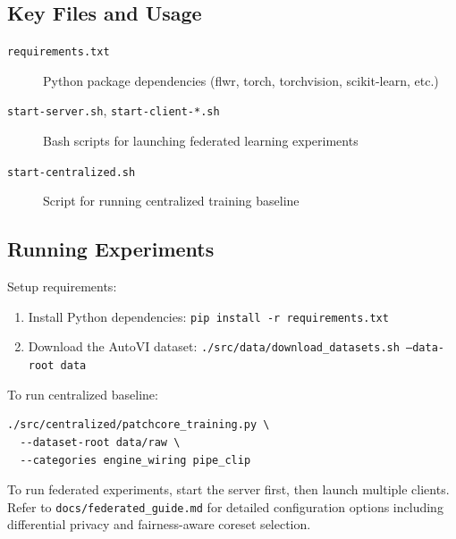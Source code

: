 \documentclass{article}
\begin{document}
\subsection{Key Files and Usage}

\begin{description}
    \item[\texttt{requirements.txt}] Python package dependencies (flwr, torch, torchvision, scikit-learn, etc.)

    \item[\texttt{start-server.sh}, \texttt{start-client-*.sh}] Bash scripts for launching federated learning experiments

    \item[\texttt{start-centralized.sh}] Script for running centralized training baseline
\end{description}

\subsection{Running Experiments}

Setup requirements:
\begin{enumerate}
    \item Install Python dependencies: \texttt{pip install -r requirements.txt}
    \item Download the AutoVI dataset: \texttt{./src/data/download\_datasets.sh --data-root data}
\end{enumerate}

To run centralized baseline:
\begin{verbatim}
./src/centralized/patchcore_training.py \
  --dataset-root data/raw \
  --categories engine_wiring pipe_clip
\end{verbatim}

To run federated experiments, start the server first, then launch multiple clients. Refer to \texttt{docs/federated\_guide.md} for detailed configuration options including differential privacy and fairness-aware coreset selection.
\end{document}
